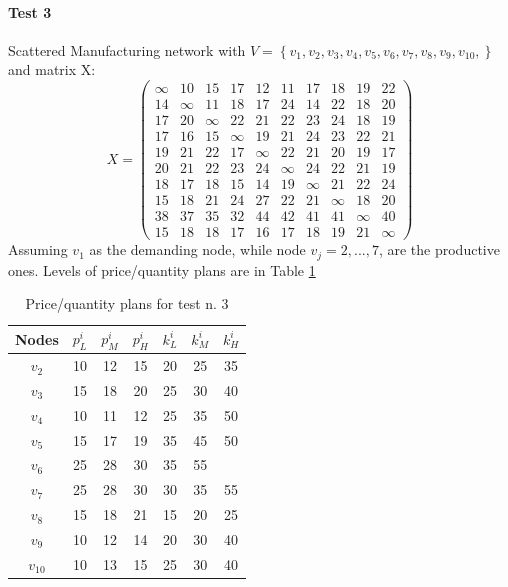 \paragraph{Test 3}
Scattered Manufacturing network with $V = \left\{ v_{1}, v_{2}, v_{3}, v_{4}, v_{5}, v_{6}, v_{7}, v_{8}, v_{9}, v_{10}, \right\}$ and matrix X: 
$$X = \begin{pmatrix} 
    \infty & 10 & 15 & 17 & 12 & 11 & 17 & 18 & 19 & 22\\
    14 & \infty & 11 & 18 & 17 & 24 & 14 & 22 & 18 & 20\\
    17 & 20 & \infty & 22 & 21 & 22 & 23 & 24 & 18 & 19\\
    17 & 16 & 15 & \infty & 19 & 21 & 24 & 23 & 22 & 21\\
    19 & 21 & 22 & 17 & \infty & 22 & 21 & 20 & 19 & 17\\
    20 & 21 & 22 & 23 & 24 & \infty & 24 & 22 & 21 & 19\\
    18 & 17 & 18 & 15 & 14 & 19 & \infty & 21 & 22 & 24\\
    15 & 18 & 21 & 24 & 27 & 22 & 21 & \infty & 18 & 20\\
    38 & 37 & 35 & 32 & 44 & 42 & 41 & 41 & \infty & 40\\
    15 & 18 & 18 & 17 & 16 & 17 & 18 & 19 & 21 & \infty
\end{pmatrix}$$
Assuming $v_1$ as the demanding node, while node $v_j = 2,...,7$, are the productive ones. Levels of price/quantity plans are in Table \ref{tab:network-price-quantity-plan-test3}
\begin{table}[h]
    \centering
    \begin{tabular}{|c|c|c|c|c|c|c|}
        \hline
        \textbf{Nodes} & \textbf{$p_L^i$} & \textbf{$p_M^i$} & \textbf{$p_H^i$} & \textbf{$k_L^i$} & \textbf{$k_M^i$} & \textbf{$k_H^i$} \\
        \hline
        $v_2$ & 10 & 12 & 15 & 20 & 25 & 35\\
        \hline
        $v_3$ & 15 & 18 & 20 & 25 & 30 & 40\\
        \hline
        $v_4$ & 10 & 11 & 12 & 25 & 35 & 50\\
        \hline
        $v_5$ & 15 & 17 & 19 & 35 & 45 & 50\\
        \hline
        $v_6$ & 25 & 28 & 30 & 35 & 55\\
        \hline
        $v_7$ & 25 & 28 & 30 & 30 & 35 & 55\\
        \hline
        $v_8$ & 15 & 18 & 21 & 15 & 20 & 25\\
        \hline
        $v_9$ & 10 & 12 & 14 & 20 & 30 & 40\\
        \hline
        $v_10$ & 10 & 13 & 15 & 25 & 30 & 40\\
        \hline
    \end{tabular}

    \caption{Price/quantity plans for test n. 3}
    \label{tab:network-price-quantity-plan-test3}
\end{table}

